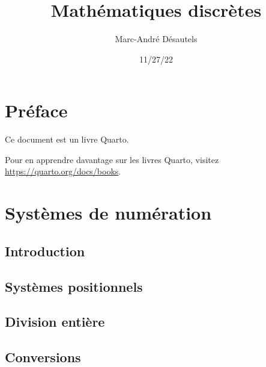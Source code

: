 \documentclass[
  letterpaper,
]{scrbook}
\title{Mathématiques discrètes}
\author{Marc-André Désautels}
\date{11/27/22}
\renewcommand*\contentsname{Table des matières}
\newcommand\contentsname{Table des matières}
\theoremstyle{definition}
\theoremstyle{definition}
\theoremstyle{remark}
\begin{document}
\frontmatter
\maketitle
\ifdefined\Shaded\renewenvironment{Shaded}{\begin{tcolorbox}[frame hidden, colback={shadecolor}, enhanced, breakable, boxrule=0pt]}{\end{tcolorbox}}\fi

\renewcommand*\contentsname{Table des matières}
{
\setcounter{tocdepth}{2}
\tableofcontents
}
\mainmatter
{}

\hypertarget{pruxe9face}{%
\chapter*{Préface}\label{pruxe9face}}


Ce document est un livre Quarto.

Pour en apprendre davantage sur les livres Quarto, visitez
\url{https://quarto.org/docs/books}.


\hypertarget{systuxe8mes-de-numuxe9ration}{%
\chapter{Systèmes de numération}\label{systuxe8mes-de-numuxe9ration}}

\hypertarget{introduction}{%
\section{Introduction}\label{introduction}}

\hypertarget{systuxe8mes-positionnels}{%
\section{Systèmes positionnels}\label{systuxe8mes-positionnels}}

\hypertarget{division-entiuxe8re}{%
\section{Division entière}\label{division-entiuxe8re}}

\hypertarget{conversions}{%
\section{Conversions}\label{conversions}}
\end{document}
